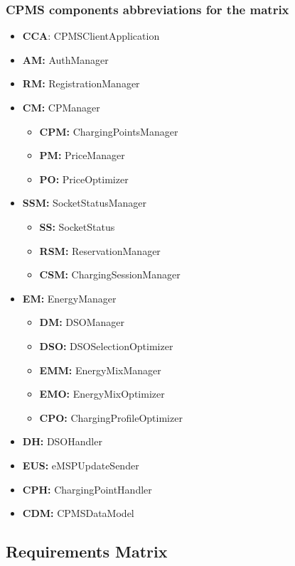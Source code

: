 \documentclass{Configuration_Files/PoliMi3i_thesis}
\begin{document}
\subsubsection{CPMS components abbreviations for the matrix}
\begin{itemize}
    \item \textbf{CCA}: CPMSClientApplication
    \item \textbf{AM:} AuthManager
    \item \textbf{RM:} RegistrationManager
    \item \textbf{CM:} CPManager
    \begin{itemize}
        \item \textbf{CPM:} ChargingPointsManager
        \item \textbf{PM:} PriceManager
        \item \textbf{PO:} PriceOptimizer
    \end{itemize}
    \item \textbf{SSM:} SocketStatusManager
    \begin{itemize}
        \item \textbf{SS:} SocketStatus
        \item \textbf{RSM:} ReservationManager
        \item \textbf{CSM:} ChargingSessionManager
    \end{itemize}
    \item \textbf{EM:} EnergyManager
    \begin{itemize}
        \item \textbf{DM:} DSOManager
        \item \textbf{DSO:} DSOSelectionOptimizer
        \item \textbf{EMM:} EnergyMixManager
        \item \textbf{EMO:} EnergyMixOptimizer
        \item \textbf{CPO:} ChargingProfileOptimizer
    \end{itemize}
    \item \textbf{DH:} DSOHandler
    \item \textbf{EUS:} eMSPUpdateSender
    \item \textbf{CPH:} ChargingPointHandler
    \item \textbf{CDM:} CPMSDataModel
\end{itemize}

\subsection{Requirements Matrix}
\end{document}
